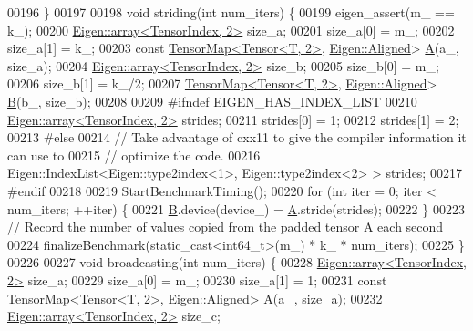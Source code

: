 \begin{DoxyCode}
00196   \}
00197 
00198  \textcolor{keywordtype}{void} striding(\textcolor{keywordtype}{int} num\_iters) \{
00199     eigen\_assert(m\_ == k\_);
00200     \hyperlink{class_eigen_1_1array}{Eigen::array<TensorIndex, 2>} size\_a;
00201     size\_a[0] = m\_;
00202     size\_a[1] = k\_;
00203     \textcolor{keyword}{const} \hyperlink{class_eigen_1_1_tensor_map}{TensorMap<Tensor<T, 2>}, \hyperlink{group__enums_gga45fe06e29902b7a2773de05ba27b47a1ad37d4c71425bb286e9b4103830538fbf}{Eigen::Aligned}> 
      \hyperlink{group___core___module_class_eigen_1_1_matrix}{A}(a\_, size\_a);
00204     \hyperlink{class_eigen_1_1array}{Eigen::array<TensorIndex, 2>} size\_b;
00205     size\_b[0] = m\_;
00206     size\_b[1] = k\_/2;
00207     \hyperlink{class_eigen_1_1_tensor_map}{TensorMap<Tensor<T, 2>}, \hyperlink{group__enums_gga45fe06e29902b7a2773de05ba27b47a1ad37d4c71425bb286e9b4103830538fbf}{Eigen::Aligned}> 
      \hyperlink{group___core___module_class_eigen_1_1_matrix}{B}(b\_, size\_b);
00208 
00209 \textcolor{preprocessor}{#ifndef EIGEN\_HAS\_INDEX\_LIST}
00210     \hyperlink{class_eigen_1_1array}{Eigen::array<TensorIndex, 2>} strides;
00211     strides[0] = 1;
00212     strides[1] = 2;
00213 \textcolor{preprocessor}{#else}
00214     \textcolor{comment}{// Take advantage of cxx11 to give the compiler information it can use to}
00215     \textcolor{comment}{// optimize the code.}
00216     Eigen::IndexList<Eigen::type2index<1>, Eigen::type2index<2> > strides;
00217 \textcolor{preprocessor}{#endif}
00218 
00219     StartBenchmarkTiming();
00220     \textcolor{keywordflow}{for} (\textcolor{keywordtype}{int} iter = 0; iter < num\_iters; ++iter) \{
00221       \hyperlink{group___core___module_class_eigen_1_1_matrix}{B}.device(device\_) = \hyperlink{group___core___module_class_eigen_1_1_matrix}{A}.stride(strides);
00222     \}
00223     \textcolor{comment}{// Record the number of values copied from the padded tensor A each second}
00224     finalizeBenchmark(static\_cast<int64\_t>(m\_) * k\_ * num\_iters);
00225   \}
00226 
00227   \textcolor{keywordtype}{void} broadcasting(\textcolor{keywordtype}{int} num\_iters) \{
00228     \hyperlink{class_eigen_1_1array}{Eigen::array<TensorIndex, 2>} size\_a;
00229     size\_a[0] = m\_;
00230     size\_a[1] = 1;
00231     \textcolor{keyword}{const} \hyperlink{class_eigen_1_1_tensor_map}{TensorMap<Tensor<T, 2>}, \hyperlink{group__enums_gga45fe06e29902b7a2773de05ba27b47a1ad37d4c71425bb286e9b4103830538fbf}{Eigen::Aligned}> 
      \hyperlink{group___core___module_class_eigen_1_1_matrix}{A}(a\_, size\_a);
00232     \hyperlink{class_eigen_1_1array}{Eigen::array<TensorIndex, 2>} size\_c;

\end{DoxyCode}
